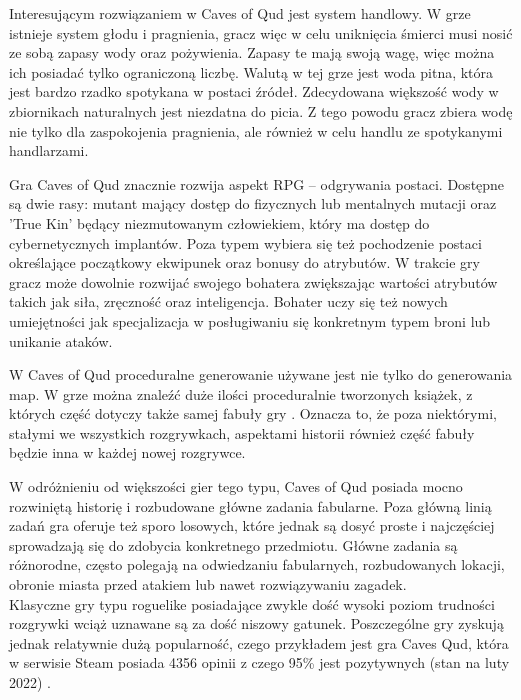 \documentclass[12pt,twoside]{article}
\begin{document}
Interesującym rozwiązaniem w Caves of Qud jest system handlowy. W grze istnieje system głodu i pragnienia, gracz więc w celu uniknięcia śmierci musi nosić ze sobą zapasy wody oraz pożywienia. Zapasy te mają swoją wagę, więc można ich posiadać tylko ograniczoną liczbę. Walutą w tej grze jest woda pitna, która jest bardzo rzadko spotykana w postaci źródeł. Zdecydowana większość wody w zbiornikach naturalnych jest niezdatna do picia. Z tego powodu gracz zbiera wodę nie tylko dla zaspokojenia pragnienia, ale również w celu handlu ze spotykanymi handlarzami.

Gra Caves of Qud znacznie rozwija aspekt RPG -- odgrywania postaci. Dostępne są dwie rasy: mutant mający dostęp do fizycznych lub mentalnych mutacji oraz 'True Kin' będący niezmutowanym człowiekiem, który ma dostęp do cybernetycznych implantów. Poza typem wybiera się też pochodzenie postaci określające początkowy ekwipunek oraz bonusy do atrybutów. W trakcie gry gracz może dowolnie rozwijać swojego bohatera zwiększając wartości atrybutów takich jak siła, zręczność oraz inteligencja. Bohater uczy się też nowych umiejętności jak specjalizacja w posługiwaniu się konkretnym typem broni lub unikanie ataków.

W Caves of Qud proceduralne generowanie używane jest nie tylko do generowania map. W grze można znaleźć duże ilości proceduralnie tworzonych książek, z których część dotyczy także samej fabuły gry \cite{coq_history}. Oznacza to, że poza niektórymi, stałymi we wszystkich rozgrywkach, aspektami historii również część fabuły będzie inna w każdej nowej rozgrywce.

W odróżnieniu od większości gier tego typu, Caves of Qud posiada mocno rozwiniętą historię i rozbudowane główne zadania fabularne. Poza główną linią zadań gra oferuje też sporo losowych, które jednak są dosyć proste i najczęściej sprowadzają się do zdobycia konkretnego przedmiotu. Główne zadania są różnorodne, często polegają na odwiedzaniu fabularnych, rozbudowanych lokacji, obronie miasta przed atakiem lub nawet rozwiązywaniu zagadek.\\

Klasyczne gry typu roguelike posiadające zwykle dość wysoki poziom trudności rozgrywki wciąż uznawane są za dość niszowy gatunek. Poszczególne gry zyskują jednak relatywnie dużą popularność, czego przykładem jest gra Caves Qud, która w serwisie Steam posiada 4356 opinii z czego 95\% jest pozytywnych (stan na luty 2022) \cite{coq_steam}.
\end{document}
